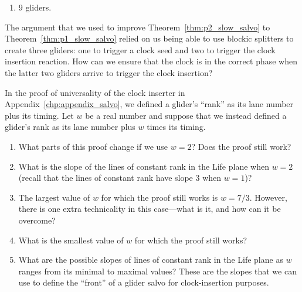 \begin{multicols}{2}
\begin{problem}
\begin{enumerate}[label=\bf\color{ocre}(\alph*)]
		\item $9$ gliders.
	\end{enumerate}
\end{problem}


\mfilbreak


\begin{problemstar}\label{exer:p2_salvo_reduce_to_p1}
	The argument that we used to improve Theorem~\ref{thm:p2_slow_salvo} to Theorem~\ref{thm:p1_slow_salvo} relied on us being able to use blockic splitters to create three gliders: one to trigger a clock seed and two to trigger the clock insertion reaction. How can we ensure that the clock is in the correct phase when the latter two gliders arrive to trigger the clock insertion?
\end{problemstar}


\mfilbreak


\begin{problemstar}\label{exer:slow_salvo_clock_slope}
	In the proof of universality of the clock inserter in Appendix~\ref{chp:appendix_salvo}, we defined a glider's ``rank'' as its lane number plus its timing. Let $w$ be a real number and suppose that we instead defined a glider's rank as its lane number plus $w$ times its timing.
	\begin{enumerate}[label=\bf\color{ocre}(\alph*)]
		\item What parts of this proof change if we use $w = 2$? Does the proof still work?
		
		\item What is the slope of the lines of constant rank in the Life plane when $w = 2$ (recall that the lines of constant rank have slope $3$ when $w = 1$)?
		
		\item The largest value of $w$ for which the proof still works is $w = 7/3$. However, there is one extra technicality in this case---what is it, and how can it be overcome?
		
		\item What is the smallest value of $w$ for which the proof still works?
		
		
		\item What are the possible slopes of lines of constant rank in the Life plane as $w$ ranges from its minimal to maximal values? These are the slopes that we can use to define the ``front'' of a glider salvo for clock-insertion purposes.
	\end{enumerate}
\end{problemstar}



\end{multicols}

